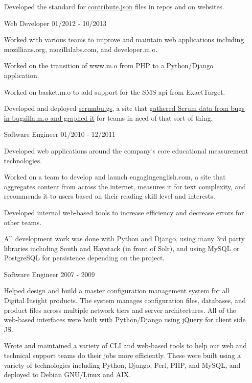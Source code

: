 \documentclass[11pt]{article} %
\begin{document}
\begin{description}
Developed the standard for \href{https://www.contributejson.org/}{contribute.json} files in repos and on websites.

           {Web Developer}
           {01/2012 - 10/2013}

Worked with various teams to improve and maintain web applications including mozillians.org, mozillalabs.com, and developer.m.o.

Worked on the transition of www.m.o from PHP to a Python/Django application.

Worked on basket.m.o to add support for the SMS api from ExactTarget.

Developed and deployed \href{https://github.com/mozilla/scrumbugz}{scrumbu.gs}, a site that
\href{https://blog.mozilla.org/webdev/2012/03/27/scrum-and-bugzilla/}{gathered Scrum data from bugs in bugzilla.m.o and graphed it} for teams in
need of that sort of thing.

           {Software Engineer}
           {01/2010 - 12/2011}

Developed web applications around the company's core educational measurement technologies.

Worked on a team to develop and launch engagingenglish.com, a site that aggregates content from across the internet,
measures it for text complexity, and recommends it to users based on their reading skill level and interests.

Developed internal web-based tools to increase efficiency and decrease errors for other teams.

All development work was done with Python and Django, using many 3rd party libraries including South and Haystack
(in front of Solr), and using MySQL or PostgreSQL for persistence depending on the project.

\pagebreak

           {Software Engineer}
           {2007 - 2009}

Helped design and build a master configuration management system for all Digital Insight products.
The system manages configuration files, databases, and product files across multiple network tiers and server architectures.
All of the web-based interfaces were built with Python/Django using jQuery for client side JS.

Wrote and maintained a variety of CLI and web-based tools to help our web and technical support teams do their jobs more efficiently.
These were built using a variety of technologies including Python, Django, Perl, PHP, and MySQL, and deployed to Debian GNU/Linux and AIX.


\end{description}
\end{document}
